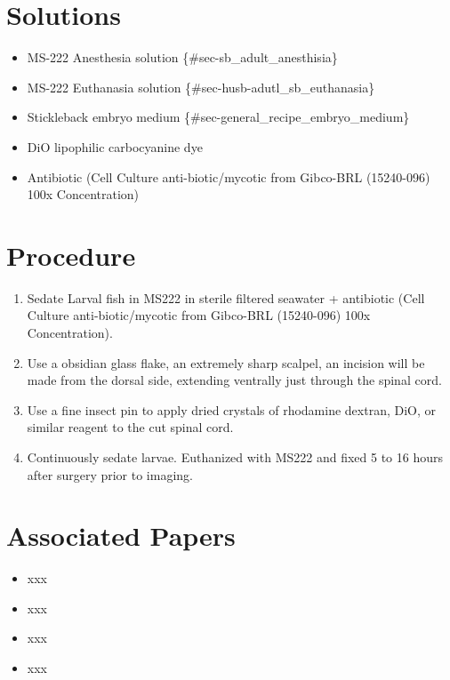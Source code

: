 \documentclass[
  letterpaper,
  DIV=11,
  numbers=noendperiod]{scrreprt}
\providecommand{\tightlist}{%
  \setlength{\itemsep}{0pt}\setlength{\parskip}{0pt}}\usepackage{longtable,booktabs,array}
\begin{document}
\hypertarget{solutions-61}{%
\section{Solutions}\label{solutions-61}}

\begin{itemize}
\tightlist
\item
  MS-222 Anesthesia solution \{\#sec-sb\_adult\_anesthisia\}
\item
  MS-222 Euthanasia solution \{\#sec-husb-adutl\_sb\_euthanasia\}
\item
  Stickleback embryo medium \{\#sec-general\_recipe\_embryo\_medium\}
\item
  DiO lipophilic carbocyanine dye
\item
  Antibiotic (Cell Culture anti-biotic/mycotic from Gibco-BRL
  (15240-096) 100x Concentration)
\end{itemize}

\hypertarget{procedure-68}{%
\section{Procedure}\label{procedure-68}}

\begin{enumerate}
\def\labelenumi{\arabic{enumi}.}
\tightlist
\item
  Sedate Larval fish in MS222 in sterile filtered seawater + antibiotic
  (Cell Culture anti-biotic/mycotic from Gibco-BRL (15240-096) 100x
  Concentration).
\item
  Use a obsidian glass flake, an extremely sharp scalpel, an incision
  will be made from the dorsal side, extending ventrally just through
  the spinal cord.
\item
  Use a fine insect pin to apply dried crystals of rhodamine dextran,
  DiO, or similar reagent to the cut spinal cord.
\item
  Continuously sedate larvae. Euthanized with MS222 and fixed 5 to 16
  hours after surgery prior to imaging.
\end{enumerate}

\hypertarget{associated-papers-46}{%
\section{Associated Papers}\label{associated-papers-46}}

\begin{itemize}
\tightlist
\item
  xxx
\item
  xxx
\item
  xxx
\item
  xxx
\end{itemize}
\end{document}
